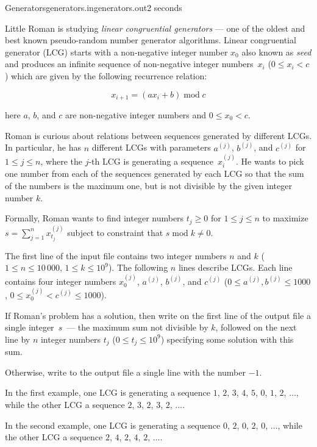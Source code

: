 \begin{problem}{Generators}{generators.in}{generators.out}{2 seconds}


Little Roman is studying \emph{linear congruential generators} --- one of the oldest and best known pseudo-random number generator algorithms.
Linear congruential generator (LCG) starts with a non-negative integer number $x_0$ also known as \emph{seed} 
and produces an infinite sequence of non-negative integer numbers~$x_i$ ($0 \le x_i < c$)
which are given by the following recurrence relation:

\begin{equation*}
x_{i+1} = (a x_i + b)\;\mathrm{mod}\;c
\end{equation*}

\noindent here $a$, $b$, and $c$ are non-negative integer numbers and $0 \le x_0 < c$.

Roman is curious about relations between sequences generated by different LCGs. In particular, he has $n$ different LCGs with parameters
$a^{(j)}$, $b^{(j)}$, and $c^{(j)}$ for $1 \le j \le n$, where the $j$-th LCG is generating a sequence~$x^{(j)}_i$. He wants to pick one number from each 
of the sequences generated by each LCG so that the sum of the numbers is the maximum one, but is not divisible by the given integer number $k$. 

Formally, Roman wants to find integer numbers $t_j \ge 0$ for $1 \le j \le n$ to maximize $s = \sum_{j=1}^{n} x_{t_j}^{(j)}$ 
subject to constraint that ${s\;\mathrm{mod}\;k \ne 0}$.

\InputFile

The first line of the input file contains two integer numbers $n$ and $k$ ($1 \le n \le 10\,000$, $1 \le k \le 10^9$). The following $n$ lines describe LCGs. 
Each line contains four integer numbers $x_0^{(j)}$, $a^{(j)}$, $b^{(j)}$, and $c^{(j)}$ 
($0 \le a^{(j)}, b^{(j)} \le 1000$, $0 \le x_0^{(j)} < c^{(j)} \le 1000$).

\OutputFile

If Roman's problem has a solution, then write on the first line of the output file a single integer~$s$~--- 
the maximum sum not divisible by $k$, 
followed on the next line by $n$ integer numbers $t_j$ ($0 \le t_j \le 10^9$) specifying some solution with this sum. 

Otherwise, write to the output file a single line with the number $-1$.

\Example

\begin{example}
%
%
\end{example}

In the first example, one LCG is generating a sequence $1$, $2$, $3$, $4$, $5$, $0$, $1$, $2$, $\ldots$, 
while the other LCG a sequence $2$, $3$, $2$, $3$, $2$, $\ldots$. 

In the second example, one LCG is generating a sequence $0$, $2$, $0$, $2$, $0$, $\ldots$,
while the other LCG a sequence $2$, $4$, $2$, $4$, $2$, $\ldots$.

\end{problem}
